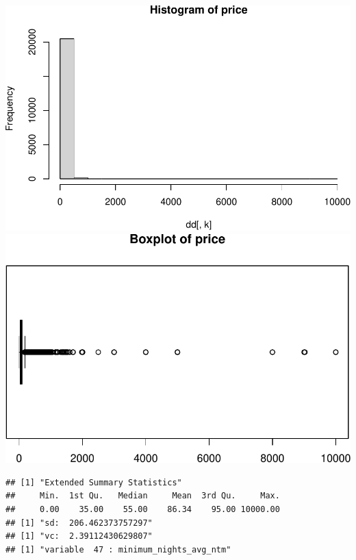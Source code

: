 \includegraphics{anal_files/figure-latex/unnamed-chunk-7-26.pdf}
\includegraphics{anal_files/figure-latex/unnamed-chunk-7-27.pdf}

\begin{verbatim}
## [1] "Extended Summary Statistics"
##     Min.  1st Qu.   Median     Mean  3rd Qu.     Max. 
##     0.00    35.00    55.00    86.34    95.00 10000.00 
## [1] "sd:  206.462373757297"
## [1] "vc:  2.39112430629807"
## [1] "variable  47 : minimum_nights_avg_ntm"
\end{verbatim}

